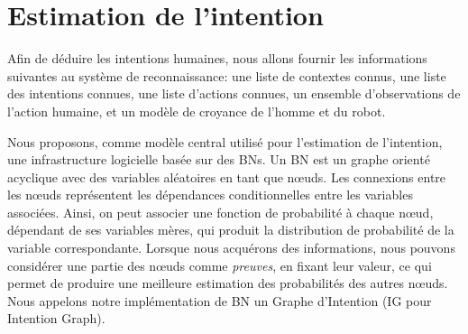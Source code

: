 \documentclass[a4paper,11pt,twoside]{StyleThese}
\begin{document}


\section{Estimation de l'intention}
\label{sec:intention_recognition}
Afin de déduire les intentions humaines, nous allons fournir les informations suivantes au système de reconnaissance: une liste de contextes connus, une liste des intentions connues, une liste d'actions connues, un ensemble d'observations de l'action humaine, et un modèle de croyance de l'homme et du robot.

Nous proposons, comme modèle central utilisé pour l'estimation de l'intention, une infrastructure logicielle basée sur des BNs. Un BN est un graphe orienté acyclique avec des variables aléatoires en tant que nœuds. Les connexions entre les nœuds représentent les dépendances conditionnelles entre les variables associées. Ainsi, on peut associer une fonction de probabilité à chaque nœud, dépendant de ses variables mères, qui produit la distribution de probabilité de la variable correspondante. Lorsque nous acquérons des informations, nous pouvons considérer une partie des nœuds comme \textit{preuves}, en fixant leur valeur, ce qui permet de produire une meilleure estimation des probabilités des autres nœuds. Nous appelons notre implémentation de BN un Graphe d'Intention (IG pour Intention Graph).

\end{document}
